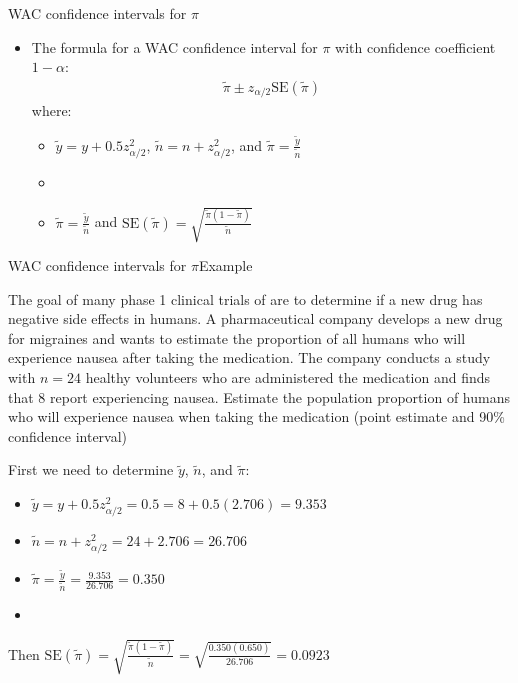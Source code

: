 \documentclass[xcolor=dvipsnames]{beamer}
\begin{document}
\begin{frame}{WAC confidence intervals for $\pi$}
	\begin{itemize}
		\item The formula for a WAC confidence interval for $\pi$ with confidence coefficient $1-\alpha$:
		\begin{gather*}
		\tilde{\pi} \pm z_{\alpha/2} \text{SE}(\tilde{\pi})
		\end{gather*}
		where:
		\begin{itemize}
			\item $\tilde{y} = y + 0.5 z_{\alpha/2}^2$, $\tilde{n} = n + z_{\alpha/2}^2$, and $\tilde{\pi}=\frac{\tilde{y}}{\tilde{n}}$
			\item[]
			\item $\tilde{\pi} = \frac{\tilde{y}}{\tilde{n}}$ and $\text{SE}(\tilde{\pi}) = \sqrt{\frac{\tilde{\pi}(1-\tilde{\pi})}{\tilde{n}}}$
		\end{itemize}
	\end{itemize}
\end{frame}

\begin{frame}{WAC confidence intervals for $\pi$}{Example}
	\begin{itemize} {\tiny
			\item The goal of many phase 1 clinical trials of are to determine if a new drug has negative side effects in humans. A pharmaceutical company develops a new drug for migraines and wants to estimate the proportion of all humans who will experience nausea after taking the medication. The company conducts a study with $n = 24$ healthy volunteers who are administered the medication and finds that 8 report experiencing nausea. Estimate the population proportion of humans who will experience nausea when taking the medication (point estimate and 90\% confidence interval) }
		\item[]
		\item First we need to determine $\tilde{y}$, $\tilde{n}$, and $\tilde{\pi}$: 
		\begin{itemize}
			\item $\tilde{y} = y + 0.5 z_{\alpha/2}^2 = 0.5 = 8 + 0.5(2.706) = 9.353$
			\item $\tilde{n} = n + z_{\alpha/2}^2 = 24 + 2.706 = 26.706$
			\item $\tilde{\pi}=\frac{\tilde{y}}{\tilde{n}} = \frac{9.353}{26.706} = 0.350$
			\item[]
		\end{itemize}
		\item Then $\text{SE}(\tilde{\pi}) = \sqrt{\frac{\tilde{\pi}(1-\tilde{\pi})}{\tilde{n}}} = \sqrt{\frac{0.350(0.650)}{26.706}} = 0.0923$
	\end{itemize}
\end{frame}
\end{document}
